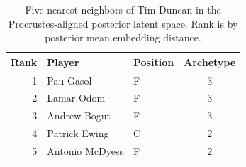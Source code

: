 \begin{table}[htbp]
  \centering\small
  \begin{tabular}{rllc}
    \toprule
    Rank & Player & Position & Archetype \\
    \midrule
    1 & Pau Gasol & F & 3 \\
    2 & Lamar Odom & F & 3 \\
    3 & Andrew Bogut & F & 3 \\
    4 & Patrick Ewing & C & 2 \\
    5 & Antonio McDyess & F & 2 \\
    \bottomrule
  \end{tabular}
  \caption{Five nearest neighbors of Tim Duncan in the Procrustes-aligned posterior latent space. Rank is by posterior mean embedding distance.}
  \label{tab:Tim_Duncan_neighbors}
\end{table}

